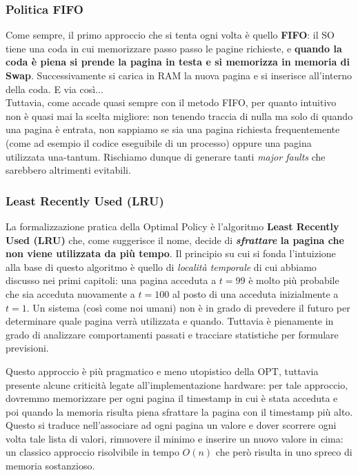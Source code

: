 \documentclass[12pt]{report}
\begin{document}
	\subsubsection*{Politica FIFO}
	Come sempre, il primo approccio che si tenta ogni volta è quello \textbf{FIFO}: il SO tiene una coda in cui memorizzare passo passo le pagine richieste, e \textbf{quando la coda è piena si prende la pagina in testa e si memorizza in memoria di Swap}. Successivamente si carica in RAM la nuova pagina e si inserisce all'interno della coda. E via così...\\
	Tuttavia, come accade quasi sempre con il metodo FIFO, per quanto intuitivo non è quasi mai la scelta migliore: non tenendo traccia di nulla ma solo di quando una pagina è entrata, non sappiamo se sia una pagina richiesta frequentemente (come ad esempio il codice eseguibile di un processo) oppure una pagina utilizzata una-tantum. Rischiamo dunque di generare tanti \textit{major faults} che sarebbero altrimenti evitabili.
	
	\subsubsection*{Least Recently Used (LRU)}
	La formalizzazione pratica della Optimal Policy è l'algoritmo \textbf{Least Recently Used (LRU)} che, come suggerisce il nome, decide di \textbf{\textit{sfrattare} la pagina che non viene utilizzata da più tempo}. Il principio su cui si fonda l'intuizione alla base di questo algoritmo è quello di \textit{località temporale} di cui abbiamo discusso nei primi capitoli: una pagina acceduta a $t=99$ è molto più probabile che sia acceduta nuovamente a $t=100$ al posto di una acceduta inizialmente a $t=1$. Un sistema (così come noi umani) non è in grado di prevedere il futuro per determinare quale pagina verrà utilizzata e quando. Tuttavia è pienamente in grado di analizzare comportamenti passati e tracciare statistiche per formulare previsioni.
	\smallbreak
	
	Questo approccio è più pragmatico e meno utopistico della OPT, tuttavia presente alcune criticità legate all'implementazione hardware: per tale approccio, dovremmo memorizzare per ogni pagina il timestamp in cui è stata acceduta e poi quando la memoria risulta piena sfrattare la pagina con il timestamp più alto. Questo si traduce nell'associare ad ogni pagina un valore e dover scorrere ogni volta tale lista di valori, rimuovere il minimo e inserire un nuovo valore in cima: un classico approccio risolvibile in tempo $O(n)$ che però risulta in uno spreco di memoria sostanzioso.
	
\end{document}
